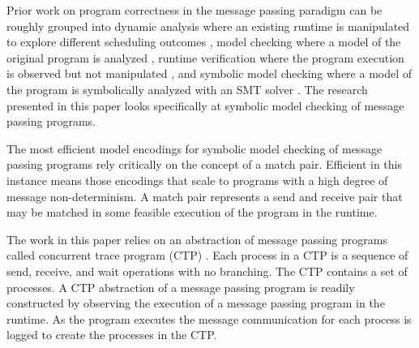 Prior work on program correctness in the message passing paradigm can be roughly grouped into dynamic analysis where an existing runtime is manipulated to explore different scheduling outcomes \cite{DBLP:conf/ppopp/VakkalankaSGK08,DBLP:conf/sbmf/SharmaGB12}, model checking where a model of the original program is analyzed \cite{DBLP:conf/vmcai/Siegel07,DBLP:conf/pvm/Siegel07}, runtime verification where the program execution is observed but not manipulated \cite{DBLP:conf/sc/VetterS00,DBLP:conf/parco/KrammerBMR03,DBLP:conf/ptw/HilbrichSSM09}, and symbolic model checking where a model of the program is symbolically analyzed with an SMT solver \cite{DBLP:conf/kbse/HuangMM13,HuangNFM15,HuangDeadlock}. The research presented in this paper looks specifically at symbolic model checking of message passing programs.

The most efficient model encodings for symbolic model checking of message passing programs rely critically on the concept of a match pair. Efficient in this instance means those encodings that scale to programs with a high degree of message non-determinism.  A match pair represents a send and receive pair that may be matched in some feasible execution of the program in the runtime. 


The work in this paper relies on an abstraction of message passing programs called concurrent trace program (CTP) \cite{DBLP:conf/kbse/HuangMM13}.
Each process in a CTP is a sequence of send, receive, and wait operations with no branching. 
The CTP contains a set of processes. 
A CTP abstraction of a message passing program is readily constructed by observing the execution of a message passing program in the runtime. 
As the program executes the message communication for each process is logged to create the processes in the CTP.



